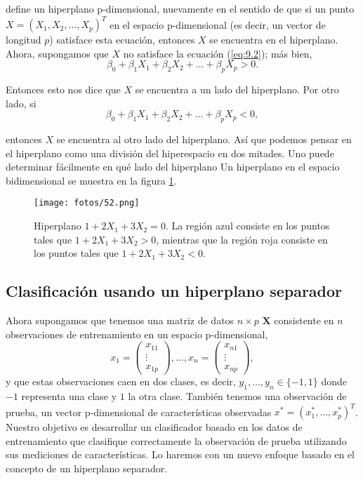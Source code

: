 \noindent define un hiperplano p-dimensional, nuevamente en el sentido de que si un punto $X = (X_1, X_2, \ldots, X_p)^T$ en el espacio p-dimensional (es decir, un vector de longitud $p$) satisface esta ecuación, entonces $X$ se encuentra en el hiperplano. \\

\noindent Ahora, supongamos que $X$ no satisface la ecuación (\ref{eq:9.2}); más bien,
\begin{equation}
\beta_0 + \beta_1 X_1 + \beta_2 X_2 + \ldots + \beta_p X_p > 0.
\end{equation}

\noindent Entonces esto nos dice que $X$ se encuentra a un lado del hiperplano. Por otro lado, si
\begin{equation}
\beta_0 + \beta_1 X_1 + \beta_2 X_2 + \ldots + \beta_p X_p < 0,
\end{equation}

\noindent entonces $X$ se encuentra al otro lado del hiperplano. Así que podemos pensar en el hiperplano como una división del hiperespacio en dos mitades. Uno puede determinar fácilmente en qué lado del hiperplano Un hiperplano en el espacio bidimensional se muestra en la figura \ref{fig:9.1}.

\begin{figure}[h]
\centering
\texttt{[image: fotos/52.png]}
\caption{Hiperplano $1 + 2X_1 + 3X_2 = 0$. La región azul consiste en los puntos tales que $1 + 2X_1 + 3X_2 > 0$, mientras que la región roja consiste en los puntos tales que $1 + 2X_1 + 3X_2 < 0$.}
\label{fig:9.1}
\end{figure}

\subsection{Clasificación usando un hiperplano separador}

Ahora supongamos que tenemos una matriz de datos $n \times p$ $\mathbf{X}$ consistente en $n$ observaciones de entrenamiento en un espacio p-dimensional,
\begin{equation}
x_1 =
\begin{pmatrix}
x_{11} \\
\vdots \\
x_{1p}
\end{pmatrix}, \ldots, x_n =
\begin{pmatrix}
x_{n1} \\
\vdots \\
x_{np}
\end{pmatrix},
\end{equation}
y que estas observaciones caen en dos clases, es decir, $y_1, \ldots, y_n \in \{-1, 1\}$ donde $-1$ representa una clase y $1$ la otra clase. También tenemos una observación de prueba, un vector p-dimensional de características observadas $x^* = (x^*_1, \ldots, x^*_p)^T$. Nuestro objetivo es desarrollar un clasificador basado en los datos de entrenamiento que clasifique correctamente la observación de prueba utilizando sus mediciones de características. Lo haremos con un nuevo enfoque basado en el concepto de un hiperplano separador. \\


